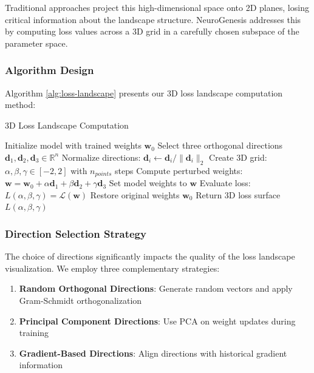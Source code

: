 \documentclass[12pt,a4paper]{article}
\begin{document}
Traditional approaches project this high-dimensional space onto 2D planes, losing critical information about the landscape structure. NeuroGenesis addresses this by computing loss values across a 3D grid in a carefully chosen subspace of the parameter space.

\subsubsection{Algorithm Design}

Algorithm \ref{alg:loss-landscape} presents our 3D loss landscape computation method:

\begin{algorithm}
\caption{3D Loss Landscape Computation}
\label{alg:loss-landscape}
\begin{algorithmic}[1]
\STATE Initialize model with trained weights \( \mathbf{w}_0 \)
\STATE Select three orthogonal directions \( \mathbf{d}_1, \mathbf{d}_2, \mathbf{d}_3 \in \mathbb{R}^n \)
\STATE Normalize directions: \( \mathbf{d}_i \leftarrow \mathbf{d}_i / \|\mathbf{d}_i\|_2 \)
\STATE Create 3D grid: \( \alpha, \beta, \gamma \in [-2, 2] \) with \( n_{points} \) steps
    \STATE Compute perturbed weights: \( \mathbf{w} = \mathbf{w}_0 + \alpha\mathbf{d}_1 + \beta\mathbf{d}_2 + \gamma\mathbf{d}_3 \)
    \STATE Set model weights to \( \mathbf{w} \)
    \STATE Evaluate loss: \( L(\alpha, \beta, \gamma) = \mathcal{L}(\mathbf{w}) \)
\ENDFOR
\STATE Restore original weights \( \mathbf{w}_0 \)
\STATE Return 3D loss surface \( L(\alpha, \beta, \gamma) \)
\end{algorithmic}
\end{algorithm}

\subsubsection{Direction Selection Strategy}

The choice of directions significantly impacts the quality of the loss landscape visualization. We employ three complementary strategies:

\begin{enumerate}
    \item \textbf{Random Orthogonal Directions}: Generate random vectors and apply Gram-Schmidt orthogonalization
    \item \textbf{Principal Component Directions}: Use PCA on weight updates during training
    \item \textbf{Gradient-Based Directions}: Align directions with historical gradient information
\end{enumerate}
\end{document}
